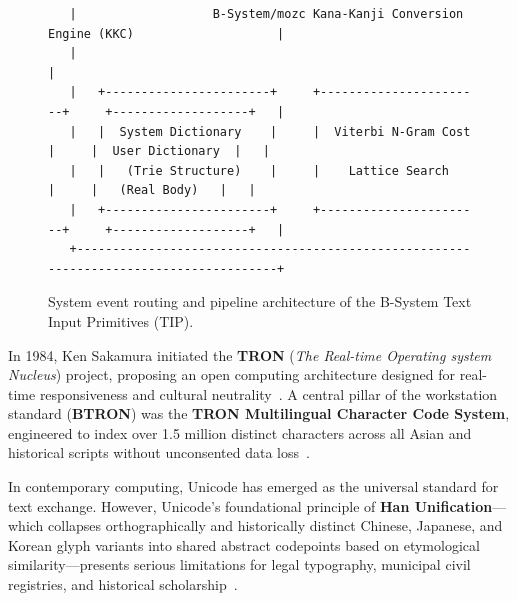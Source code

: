 \documentclass[10pt,journal,compsoc,twocolumn]{article}
\begin{document}
\begin{figure}[htbp]
\begin{lstlisting}
   |                   B-System/mozc Kana-Kanji Conversion Engine (KKC)                    |
   |                                                                                       |
   |   +-----------------------+     +-----------------------+     +-------------------+   |
   |   |  System Dictionary    |     |  Viterbi N-Gram Cost  |     |  User Dictionary  |   |
   |   |   (Trie Structure)    |     |    Lattice Search     |     |   (Real Body)   |   |
   |   +-----------------------+     +-----------------------+     +-------------------+   |
   +---------------------------------------------------------------------------------------+
\end{lstlisting}
\caption{System event routing and pipeline architecture of the B-System Text Input Primitives (TIP).}
\label{fig:tip_arch}
\end{figure}

In 1984, Ken Sakamura initiated the \textbf{TRON} (\emph{The Real-time Operating system Nucleus}) project, proposing an open computing architecture designed for real-time responsiveness and cultural neutrality~\cite{sakamura1984tron}. A central pillar of the workstation standard (\textbf{BTRON}) was the \textbf{TRON Multilingual Character Code System}, engineered to index over 1.5 million distinct characters across all Asian and historical scripts without unconsented data loss~\cite{troncharset}.

In contemporary computing, Unicode has emerged as the universal standard for text exchange. However, Unicode's foundational principle of \textbf{Han Unification}---which collapses orthographically and historically distinct Chinese, Japanese, and Korean glyph variants into shared abstract codepoints based on etymological similarity---presents serious limitations for legal typography, municipal civil registries, and historical scholarship~\cite{lunde2008cjk}.
\end{document}
